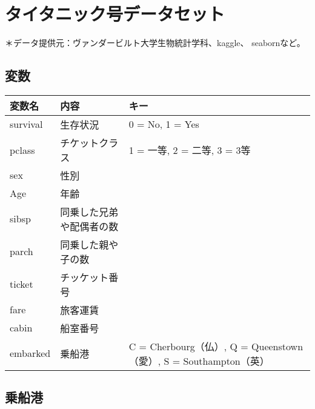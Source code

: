 \documentclass[9pt]{ltjsarticle}
\begin{document}
    \begin{center}
\end{center}

    \newpage

    \hypertarget{ux30bfux30a4ux30bfux30cbux30c3ux30afux53f7ux30c7ux30fcux30bfux30bbux30c3ux30c8}{%
\section{タイタニック号データセット}\label{ux30bfux30a4ux30bfux30cbux30c3ux30afux53f7ux30c7ux30fcux30bfux30bbux30c3ux30c8}}

    ＊データ提供元：ヴァンダービルト大学生物統計学科\cite{vanderbilt}、kaggle\cite{kaggle}、
seaborn\cite{seaborn}など。

    \hypertarget{ux5909ux6570}{%
\subsection{変数}\label{ux5909ux6570}}

    \begin{longtable}[]{@{}lll@{}}
\toprule
変数名　 & 内容 & キー\tabularnewline
\midrule
\endhead
survival & 生存状況 & 0 = No, 1 = Yes\tabularnewline
pclass　 & チケットクラス & 1 = 一等, 2 = 二等, 3 = 3等\tabularnewline
sex & 性別 &\tabularnewline
Age & 年齢 &\tabularnewline
sibsp & 同乗した兄弟や配偶者の数 &\tabularnewline
parch & 同乗した親や子の数 &\tabularnewline
ticket & チッケット番号 &\tabularnewline
fare & 旅客運賃 &\tabularnewline
cabin & 船室番号 &\tabularnewline
embarked & 乗船港 & C = Cherbourg（仏）, Q = Queenstown（愛）, S =
Southampton（英）\tabularnewline
\bottomrule
\end{longtable}

    \hypertarget{ux4e57ux8239ux6e2f}{%
\subsection{乗船港}\label{ux4e57ux8239ux6e2f}}
\end{document}
